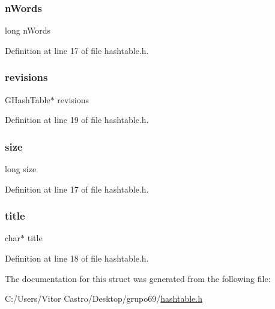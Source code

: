 \subsubsection{\texorpdfstring{n\+Words}{nWords}}
{\footnotesize\ttfamily long n\+Words}



Definition at line 17 of file hashtable.\+h.

\mbox{\label{structarticle_a5b12469c773e88300c38ce18f013d4a6}} 
\subsubsection{\texorpdfstring{revisions}{revisions}}
{\footnotesize\ttfamily G\+Hash\+Table$\ast$ revisions}



Definition at line 19 of file hashtable.\+h.

\mbox{\label{structarticle_a37363161b41c4165b98cba7abc7a9d95}} 
\subsubsection{\texorpdfstring{size}{size}}
{\footnotesize\ttfamily long size}



Definition at line 17 of file hashtable.\+h.

\mbox{\label{structarticle_af06d911bb9e05f491ef3da520d03796c}} 
\subsubsection{\texorpdfstring{title}{title}}
{\footnotesize\ttfamily char$\ast$ title}



Definition at line 18 of file hashtable.\+h.



The documentation for this struct was generated from the following file\+:\begin{DoxyCompactItemize}
\item 
C\+:/\+Users/\+Vitor Castro/\+Desktop/grupo69/\hyperlink{hashtable_8h}{hashtable.\+h}\end{DoxyCompactItemize}
